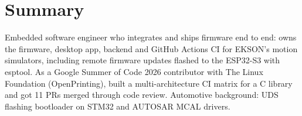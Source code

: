 \documentclass[10pt]{article}
\begin{document}

\section*{Summary}
Embedded software engineer who integrates and ships firmware end to end: owns the firmware, desktop app, backend and GitHub Actions CI for EKSON's motion simulators, including remote firmware updates flashed to the ESP32-S3 with esptool. As a Google Summer of Code 2026 contributor with The Linux Foundation (OpenPrinting), built a multi-architecture CI matrix for a C library and got 11 PRs merged through code review. Automotive background: UDS flashing bootloader on STM32 and AUTOSAR MCAL drivers.
\end{document}
